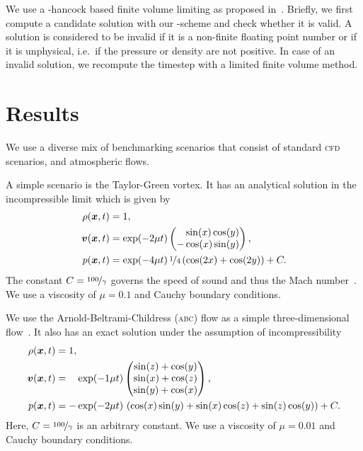 \documentclass[runningheads]{llncs}
\begin{document}
We use a \muscl{}-hancock based finite volume limiting as proposed in~\cite{dumbser2016simple}.
Briefly, we first compute a candidate solution with our \aderdg{}-scheme and check whether it is valid.
A solution is considered to be invalid if it is a non-finite floating point number or if it is unphysical, i.e.\ if the pressure or density are not positive.
In case of an invalid solution, we recompute the timestep with a limited \muscl{} finite volume method.

\section{Results}
We use a diverse mix of benchmarking scenarios that consist of standard \textsc{cfd} scenarios, and atmospheric flows.

A simple scenario is the Taylor-Green vortex.
It has an analytical solution in the incompressible limit which is given by
\begin{align}
  \label{eq:taylor-green}
  \begin{split}
  \rho(\bm{x}, t) &= 1,\\
  \bm{v}(\bm{x}, t) &= \exp(-2 \mu t)
  \begin{pmatrix}
    \phantom{-}\sin(x) \cos(y) \\
- \cos(x) \sin(y) 
    \end{pmatrix}, \\
  p(\bm{x}, t) &= \exp(-4 \mu t) \, \nicefrac{1}{4} \left( \cos(2x) + \cos(2y) \right) + C.
  \end{split}
\end{align}
The constant $C = \nicefrac{100}{\gamma}$ governs the speed of sound and thus the Mach number~\cite{dumbser2016high}.
We use a viscosity of $\mu = 0.1$ and Cauchy boundary conditions.

We use the Arnold-Beltrami-Childress (\textsc{abc}) flow as a simple three-dimensional flow~\cite{tavelli2016staggered}.
It also has an exact solution under the assumption of incompressibility
\begin{align}
  \label{eq:abc-flow}
  \begin{split}
  \rho(\bm{x}, t) &= 1,\\
  \bm{v}(\bm{x}, t) &= \phantom{-} \exp(-1\mu t)
  \begin{pmatrix}
    \sin(z) + \cos(y)\\
    \sin(x) + \cos(z)\\
    \sin(y) + \cos(x)
  \end{pmatrix}, \\
  p(\bm{x}, t) &= -\exp(-2 \mu t) \, \left(\cos(x)\sin(y) + \sin(x)\cos(z) + \sin(z)\cos(y)\right)
  + C.
  \end{split}
\end{align}
Here, $C = \nicefrac{100}{\gamma}$ is an arbitrary constant.
We use a viscosity of $\mu = 0.01$ and Cauchy boundary conditions.
\end{document}

